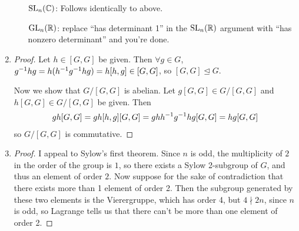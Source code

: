 \documentclass[12pt, twosided]{article}
\begin{document}
\begin{enumerate}
\begin{itemize}
  \item [\(\mathrm{SL}_n(\mathbb{C})\):] Follows identically to above.
  \item [\(\mathrm{GL}_n(\mathbb{R})\):] replace ``has determinant 1'' in the \(\mathrm{SL}_n(\mathbb{R})\) argument with ``has nonzero determinant'' and you're done.
  \end{itemize}
\item
  \begin{proof}
    Let \(h \in [G, G]\) be given. Then \(\forall g\in G\), \(g^{-1}hg = h(h^{-1}g^{-1}hg) = h[h, g] \in [G, G]\), so \([G, G] \trianglelefteq G\). \partdone

    Now we show that \(G/[G,G]\) is abelian. Let \(g[G, G] \in G/[G,G]\) and \(h[G, G] \in G/[G,G]\) be given. Then
    \begin{align*}
      gh[G,G] = gh[h,g][G,G] = ghh^{-1}g^{-1}hg[G,G] = hg[G,G]
    \end{align*}
    so \(G/[G,G]\) is commutative.
  \end{proof}
\item
  \begin{proof}
    I appeal to Sylow's first theorem. Since \(n\) is odd, the multiplicity of \(2\) in the order of the group is \(1\), so there exists a Sylow 2-subgroup of \(G\), and thus an element of order \(2\). Now suppose for the sake of contradiction that there exists more than 1 element of order 2. Then the subgroup generated by these two elements is the Vierergruppe, which has order 4, but \(4 \nmid 2n\), since \(n\) is odd, so Lagrange tells us that there can't be more than one element of order 2.
  \end{proof}


\end{enumerate}
\end{document}

